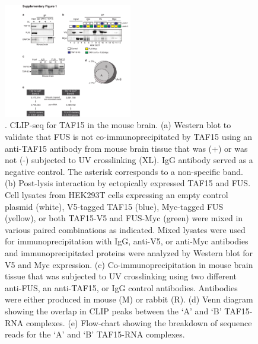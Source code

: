 \begin{figure}[ht]
  \centering
  \includegraphics[width=0.5\textwidth]{chapter_2_figures/Figure_S1}
  \caption[Supplementary Figure 1]{. CLIP-seq for TAF15 in the mouse brain. (a) Western blot to validate that FUS is not co-immunoprecipitated by TAF15 using an anti-TAF15 antibody from mouse brain tissue that was (+) or was not (-) subjected to UV crosslinking (XL). IgG antibody served as a negative control. The asterisk corresponds to a non-specific band. (b) Post-lysis interaction by ectopically expressed TAF15 and FUS. Cell lysates from HEK293T cells expressing an empty control plasmid (white), V5-tagged TAF15 (blue), Myc-tagged FUS (yellow), or both TAF15-V5 and FUS-Myc (green) were mixed in various paired combinations as indicated. Mixed lysates were used for immunoprecipitation with IgG, anti-V5, or anti-Myc antibodies and immunoprecipitated proteins were analyzed by Western blot for V5 and Myc expression. (c) Co-immunoprecipitation in mouse brain tissue that was subjected to UV crosslinking using two different anti-FUS, an anti-TAF15, or IgG control antibodies. Antibodies were either produced in mouse (M) or rabbit (R). (d) Venn diagram showing the overlap in CLIP peaks between the ‘A’ and ‘B’ TAF15-RNA complexes. (e) Flow-chart showing the breakdown of sequence reads for the ‘A’ and ‘B’ TAF15-RNA complexes.}
  \label{fig:Figure_S1}
\end{figure}

